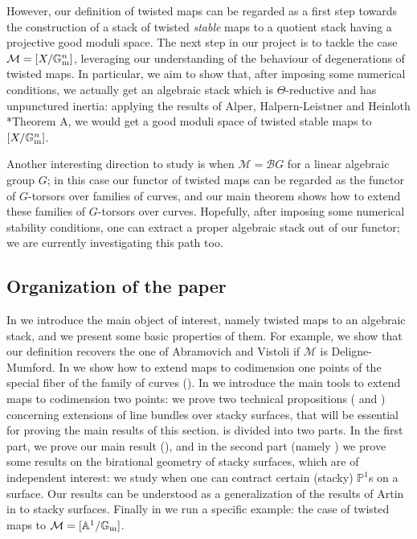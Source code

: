 \documentclass{amsart}
\newcommand{\bA}{\mathbb{A}}
\newcommand{\bG}{\mathbb{G}}
\newcommand{\bP}{\mathbb{P}}
\newcommand{\cB}{\mathcal{B}}
\newcommand{\cM}{\mathcal{M}}
\newcommand{\Gm}{\bG_{{\rm m}}}
\theoremstyle{definition}
\begin{document}
However, our definition of twisted maps can be regarded as a first step towards the construction of a stack of twisted \textit{stable} maps to a quotient stack having a projective good moduli space.
The next step in our project is to tackle the case $\cM=[X/\Gm^n]$, leveraging our
understanding of the behaviour of degenerations of twisted maps. In particular, we aim to show that, after imposing some numerical conditions, we actually get an algebraic stack which is $\Theta$-reductive and has unpunctured inertia: applying the results of Alper, Halpern-Leistner and Heinloth \cite{AHH}*{Theorem A}, we would get a good moduli space of twisted stable maps to $[X/\Gm^n]$. 

Another interesting direction to study is when $\cM=\cB G$ for a linear algebraic group $G$; in this case our functor of twisted maps can be regarded as the functor of $G$-torsors over families of curves, and our main theorem shows how to extend these families of $G$-torsors over curves. Hopefully, after imposing some numerical stability conditions, one can extract a proper algebraic stack out of our functor; we are currently investigating this path too.

\subsection*{Organization of the paper} In  we introduce the main object of interest, namely twisted maps to an algebraic stack, and we present some basic properties of them. For example, we show that our definition recovers the one of Abramovich and Vistoli if $\cM$ is Deligne-Mumford. In  we show how to extend maps to codimension one points of the special fiber of the family of curves (). In  we introduce the main tools to extend maps to codimension two points: we prove two technical propositions ( and ) concerning extensions of line bundles over stacky surfaces, that will be essential for proving the main results of this section.  is divided into two parts. In the first part, we prove our main result (), and in the second part (namely ) we prove some results on the birational geometry of stacky surfaces, which are of independent interest: we study when one can contract certain (stacky) $\bP^1$s on a surface. Our results can be understood as a generalization of the results of Artin in \cite{Artin_contracting_curves} to stacky surfaces. Finally in  we run a specific example: the case of twisted maps to $\cM=[\bA^1/\Gm]$.
\end{document}
